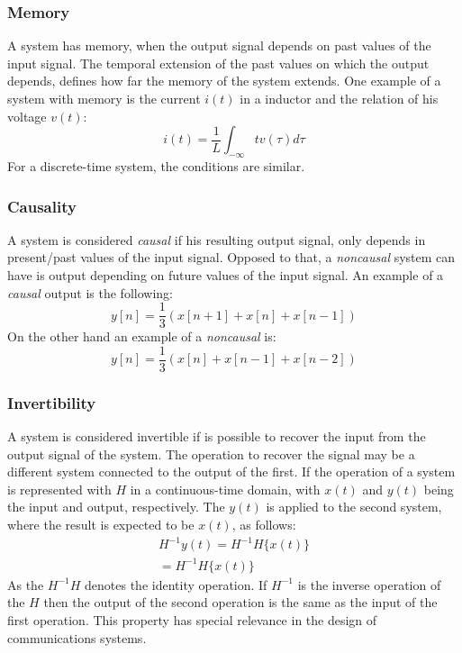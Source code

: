 \subsubsection*{Memory}
A system has memory, when the output signal depends on past values of the input signal. The temporal extension of the past values on which the output depends, defines how far the memory of the system extends. One example of a system with memory is the current $i(t)$ in a inductor and the relation of his voltage $v(t)$:
\begin{equation}
    i(t)=\frac{1}{L}\int_{-\infty}{t}v(\tau)d\tau
\end{equation}
For a discrete-time system, the conditions are similar. 
\subsubsection*{Causality}
A system is considered \textit{causal} if his resulting output signal, only depends in present/past values of the input signal. Opposed to that, a \textit{noncausal} system can have is output depending on future values of the input signal.
An example of a \textit{causal} output is the following:
\begin{equation}
    y[n] = \frac{1}{3}(x[n+1]+x[n]+x[n-1])
\end{equation}
On the other hand an example of a \textit{noncausal} is:
\begin{equation}
    y[n] = \frac{1}{3}(x[n]+x[n-1]+x[n-2])
\end{equation}
\subsubsection*{Invertibility}
A system is considered invertible if is possible to recover the input from the output signal of the system. The operation to recover the signal may be a different system connected to the output of the first. If the operation of a system is represented with $H$ in a continuous-time domain, with $x(t)$ and $y(t)$ being the input and output, respectively. The $y(t)$ is applied to the second system, where the result is expected to be $x(t)$, as follows:
\begin{equation}
    \begin{aligned}
        H^{-1}{y(t)} = H^{-1}{H\{x(t)\}}\\
        = H^{-1}H\{x(t)\}    
    \end{aligned}
\end{equation} 
As the $H^{-1}H$ denotes the identity operation. If $H^{-1}$ is the inverse operation of the $H$ then the output of the second operation is the same as the input of the first operation. This property has special relevance in the design of communications systems. 

